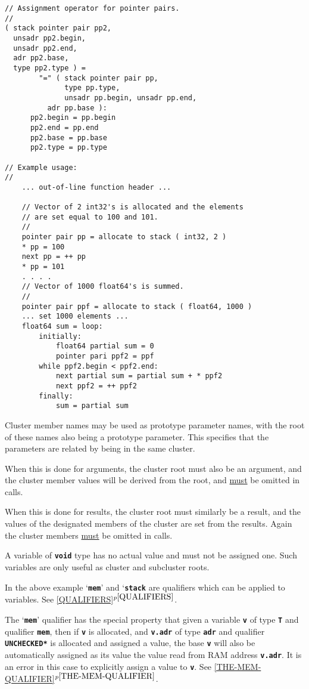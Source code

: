 \documentclass[12pt]{article}
\newcommand{\TT}[1]{{\tt \bfseries #1}}
\newcommand{\itemref}[1]{\ref{#1}$^{p\pageref{#1}}$}
\newenvironment{indpar}[1][0.3in]%
	{\begin{list}{}%
		     {\setlength{\itemsep}{0in}%
		      \setlength{\topsep}{0in}%
		      \setlength{\parsep}{1ex}%
		      \setlength{\labelwidth}{#1}%
		      \setlength{\leftmargin}{#1}%
		      \addtolength{\leftmargin}{\labelsep}}%
	 \item}%
	{\end{list}}
\begin{document}
\begin{indpar}
\begin{verbatim}
// Assignment operator for pointer pairs.
//
( stack pointer pair pp2,
  unsadr pp2.begin,
  unsadr pp2.end,
  adr pp2.base,
  type pp2.type ) =
        "=" ( stack pointer pair pp,
              type pp.type,
              unsadr pp.begin, unsadr pp.end,
	      adr pp.base ):
      pp2.begin = pp.begin
      pp2.end = pp.end
      pp2.base = pp.base
      pp2.type = pp.type

// Example usage:
//
    ... out-of-line function header ...

    // Vector of 2 int32's is allocated and the elements
    // are set equal to 100 and 101.
    //
    pointer pair pp = allocate to stack ( int32, 2 )
    * pp = 100
    next pp = ++ pp
    * pp = 101
    . . . .
    // Vector of 1000 float64's is summed.
    //
    pointer pair ppf = allocate to stack ( float64, 1000 )
    ... set 1000 elements ...
    float64 sum = loop:
        initially:
            float64 partial sum = 0
            pointer pari ppf2 = ppf
        while ppf2.begin < ppf2.end:
            next partial sum = partial sum + * ppf2
            next ppf2 = ++ ppf2
        finally:
            sum = partial sum
\end{verbatim}\end{indpar}

Cluster member names may be used as prototype parameter
names, with the root of these names also being a prototype
parameter.  This specifies that the parameters are related
by being in the same cluster.

When this is done for arguments, the cluster root must
also be an argument, and the cluster member values
will be derived from the root, and \underline{must}
be omitted in calls.

When this is done for results, the cluster root must similarly
be a result, and the values of the designated
members of the cluster are set from the results.
Again the cluster members \underline{must} be omitted in calls.

A variable of \TT{void} type has no actual value
and must not be assigned one.  Such variables are only useful
as cluster and subcluster roots.

In the above example `\TT{mem}' and `\TT{stack} are qualifiers
which can be applied to variables.
See \itemref{QUALIFIERS}.

The `\TT{mem}' qualifier has the special property that given a variable
\TT{v} of type \TT{T} and qualifier \TT{mem}, then if \TT{v} is allocated,
and \TT{v.adr} of type \TT{adr} and qualifier \TT{*UNCHECKED*}
is allocated and
assigned a value, the base \TT{v} will also be automatically
assigned as its value the value read from RAM address \TT{v.adr}.
It is an error in this case to explicitly assign a value to \TT{v}.
See \itemref{THE-MEM-QUALIFIER}.
\end{document}
